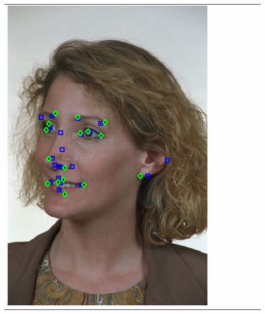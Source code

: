 \documentclass[portrait,final,a0paper,fontscale=0.277]{baposter}
\begin{document}
\begin{poster}
{{\begin{tabular}{@{}rccccccc@{}}
\parbox[c]{0.11\linewidth}{\includegraphics[width=\linewidth]{images/l_hl_success_2.pdf}} &

\end{tabular}}}
\end{poster}
\end{document}
